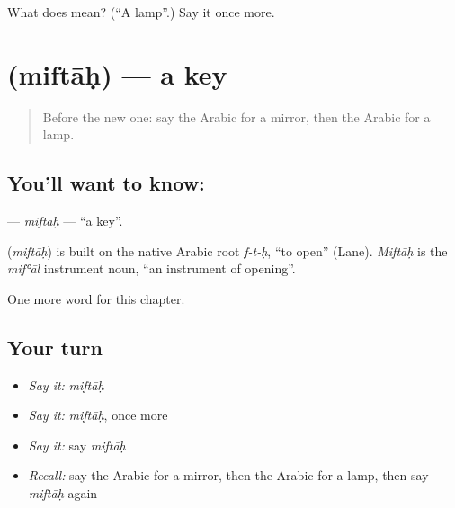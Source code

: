\begin{tcolorbox}[breakable,colback=teal!4,colframe=teal!35!black,title={Before you move on}]
What does  mean? (\textquotedblleft{}A lamp\textquotedblright{}.) Say it once more.
\end{tcolorbox}
\section[\texorpdfstring{\ar{مفتاح} (miftāḥ)}{مفتاح (miftāḥ)}]{ (miftāḥ) — a key}

\label{lesson:AR-C71-miftah}



\begin{quote}
Before the new one: say the Arabic for a mirror, then the Arabic for a lamp.
\end{quote}

\subsection*{You'll want to know: }
\textbf{} — \emph{miftāḥ} — \textquotedblleft{}a key\textquotedblright{}.

\begin{cousinweb}
\textbf{} (\emph{miftāḥ}) is built on the native Arabic root \emph{f-t-ḥ}, \textquotedblleft{}to open\textquotedblright{} (Lane). \emph{Miftāḥ} is the \emph{mifʿāl} instrument noun, \textquotedblleft{}an instrument of opening\textquotedblright{}.
\end{cousinweb}

\begin{grammarlens}[title={What you've built}]
One more word for this chapter.
\end{grammarlens}

\subsection*{Your turn}
\begin{itemize}
\raggedright
  \item \emph{Say it:} \emph{miftāḥ}
  \item \emph{Say it:} \emph{miftāḥ}, once more
  \item \emph{Say it:} say \emph{miftāḥ}
  \item \emph{Recall:} say the Arabic for a mirror, then the Arabic for a lamp, then say \emph{miftāḥ} again
\end{itemize}

